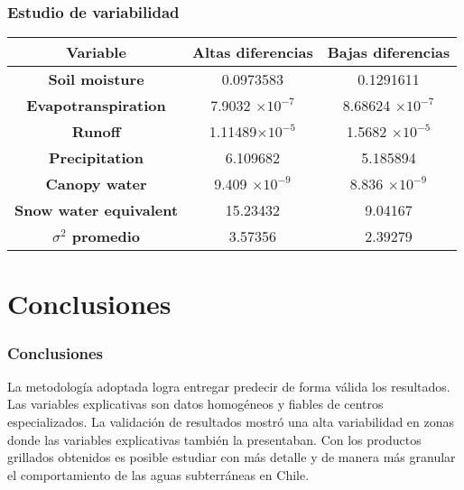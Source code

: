 \documentclass{beamer}
\begin{document}
  \begin{frame}
    \frametitle{Estudio de variabilidad}
    \centering
    \begin{tabular}{|c|c|c|}
      \hline
      \textbf{Variable}	& \textbf{Altas diferencias}	& \textbf{Bajas diferencias} \\
      \hline
      \textbf{Soil moisture}		         & 0.0973583                  & 0.1291611\\
      \textbf{Evapotranspiration}	       & 7.9032 $\times 10^{-7}$    & 8.68624 $\times 10^{-7}$\\
      \textbf{Runoff}		                 & 1.11489$\times 10^{-5}$    & 1.5682 $\times 10^{-5}$  \\
      \textbf{Precipitation}		         & 6.109682                   & 5.185894\\
      \textbf{Canopy water}		           & 9.409  $\times 10^{-9}$    & 8.836  $\times 10^{-9}$\\
      \textbf{Snow water equivalent}	   & 15.23432                   & 9.04167 \\
      \hline
      \textbf{$\sigma^2$ promedio}         & 3.57356                    & 2.39279\\
      \hline
    \end{tabular}
  \end{frame}

  \section{Conclusiones}

  \begin{frame}
    \frametitle{Conclusiones}

    \begin{outline}
      \1 La metodología adoptada logra entregar predecir de forma válida los resultados.
      \1 Las variables explicativas son datos homogéneos y fiables de centros especializados.
      \1 La validación de resultados mostró una alta variabilidad en zonas donde las variables explicativas también la presentaban.
      \1 Con los productos grillados obtenidos es posible estudiar con más detalle y de manera más granular el comportamiento
      de las aguas subterráneas en Chile.
      
    \end{outline}
  \end{frame}
\end{document}
